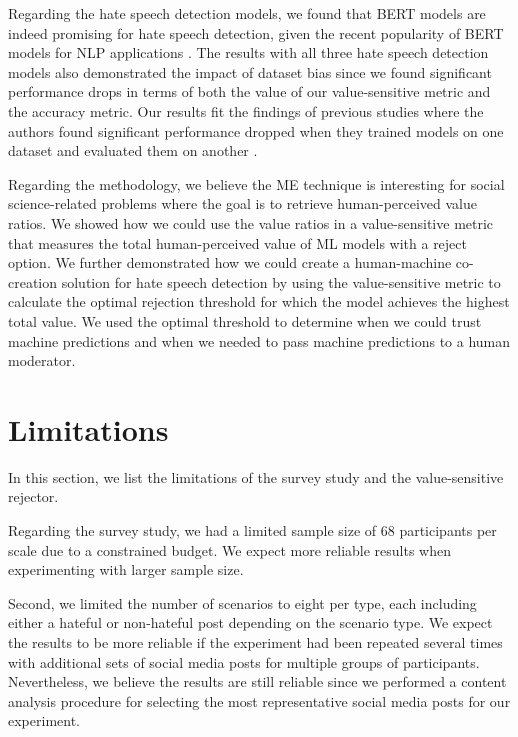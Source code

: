 %
Regarding the hate speech detection models, we found that BERT models are indeed promising for hate speech detection, given the recent popularity of BERT models for NLP applications \citep{edwards2021best,alatawi2021detecting}.
%
The results with all three hate speech detection models also demonstrated the impact of dataset bias since we found significant performance drops in terms of both the value of our value-sensitive metric and the accuracy metric.
%
Our results fit the findings of previous studies where the authors found significant performance dropped when they trained models on one dataset and evaluated them on another \citep{grondahl2018all, arango2019hate}.
%

%
Regarding the methodology, we believe the ME technique is interesting for social science-related problems where the goal is to retrieve human-perceived value ratios.
%
We showed how we could use the value ratios in a value-sensitive metric that measures the total human-perceived value of ML models with a reject option.
%
We further demonstrated how we could create a human-machine co-creation solution for hate speech detection by using the value-sensitive metric to calculate the optimal rejection threshold for which the model achieves the highest total value.
%
We used the optimal threshold to determine when we could trust machine predictions and when we needed to pass machine predictions to a human moderator.

\section{Limitations}
\label{sec:discussion-limitations}
In this section, we list the limitations of the survey study and the value-sensitive rejector.
%

%
Regarding the survey study, we had a limited sample size of 68 participants per scale due to a constrained budget.
%
We expect more reliable results when experimenting with larger sample size.
%

%
Second, we limited the number of scenarios to eight per type, each including either a hateful or non-hateful post depending on the scenario type.
%
We expect the results to be more reliable if the experiment had been repeated several times with additional sets of social media posts for multiple groups of participants.
%
Nevertheless, we believe the results are still reliable since we performed a content analysis procedure for selecting the most representative social media posts for our experiment.
%

